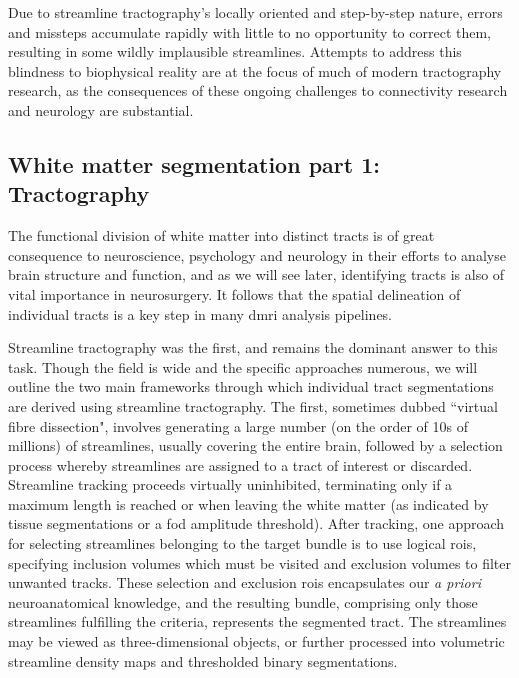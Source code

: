 Due to streamline tractography's locally oriented and step-by-step nature, errors and missteps accumulate rapidly with little to no opportunity to correct them, resulting in some wildly implausible streamlines.
Attempts to address this blindness to biophysical reality are at the focus of much of modern tractography research\autocite{Bastiani2017,Rheault2019,Aydogan2021}, as the consequences of these ongoing challenges to connectivity research and neurology are substantial\autocite{Schilling2019, Yang2021, Grisot2021}.

\subsection{White matter segmentation part 1: Tractography}

The functional division of white matter into distinct tracts is of great consequence to neuroscience, psychology and neurology in their efforts to analyse brain structure and function, and as we will see later, identifying tracts is also of vital importance in neurosurgery.
It follows that the spatial delineation of individual tracts is a key step in many \gls{dmri} analysis pipelines.

Streamline tractography was the first, and remains the dominant answer to this task.
Though the field is wide and the specific approaches numerous, we will outline the two main frameworks through which individual tract segmentations are derived using streamline tractography.
The first, sometimes dubbed ``virtual fibre dissection", involves generating a large number (on the order of 10s of millions) of streamlines, usually covering the entire brain, followed by a selection process whereby streamlines are assigned to a tract of interest or discarded.
Streamline tracking proceeds virtually uninhibited, terminating only if a maximum length is reached or when leaving the white matter (as indicated by tissue segmentations\autocite{Smith2012} or a \gls{fod} amplitude threshold).
After tracking, one approach for selecting streamlines belonging to the target bundle is to use logical \glspl{roi}, specifying inclusion volumes which must be visited and exclusion volumes to filter unwanted tracks.
These selection and exclusion \glspl{roi} encapsulates our \textit{a priori} neuroanatomical knowledge, and the resulting bundle, comprising only those streamlines fulfilling the criteria, represents the segmented tract.
The streamlines may be viewed as three-dimensional objects, or further processed into volumetric streamline density maps\autocite{Calamante2010} and thresholded binary segmentations.

